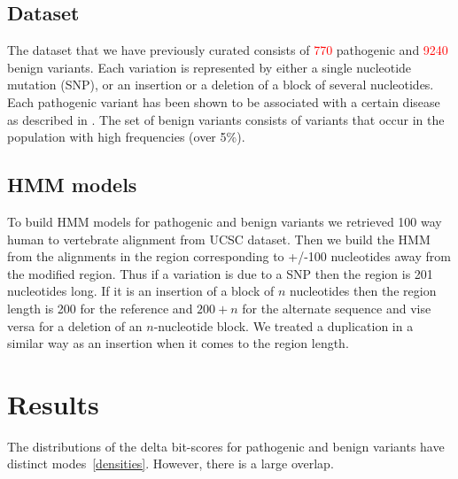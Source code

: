 \documentclass[12pt,article]{article}
\newcommand{\todo}[1]{\textcolor{red}{#1}}
\begin{document}
\subsection{Dataset}

The dataset that we have previously curated \cite{biggs2020ncVarDB} consists of \todo{770} pathogenic and \todo{9240} benign variants. Each variation is represented by either a single nucleotide mutation (SNP), or an insertion or a deletion of a block of several nucleotides. Each pathogenic variant has been shown to be associated with a certain disease as described in \cite{biggs2020ncVarDB}. The set of benign variants consists of variants that occur in the population with high frequencies (over 5\%). 

\subsection{HMM models}

To build HMM models for pathogenic and benign variants we retrieved 100 way human to vertebrate alignment from UCSC dataset. Then we build the HMM from the alignments in the region corresponding to +/-100 nucleotides away from the modified region. Thus if a variation is due to a SNP then the region is 201 nucleotides long. If it is an insertion of a block of $n$ nucleotides then the region length is 200 for the reference and $200+n$ for the alternate sequence and vise versa for a deletion of an $n$-nucleotide block. We treated a duplication in a similar way as an insertion when it comes to the region length. 

\section{Results}

The distributions of the delta bit-scores for pathogenic and benign variants have distinct modes~\ref{densities}. However, there is a large overlap. 
\end{document}
